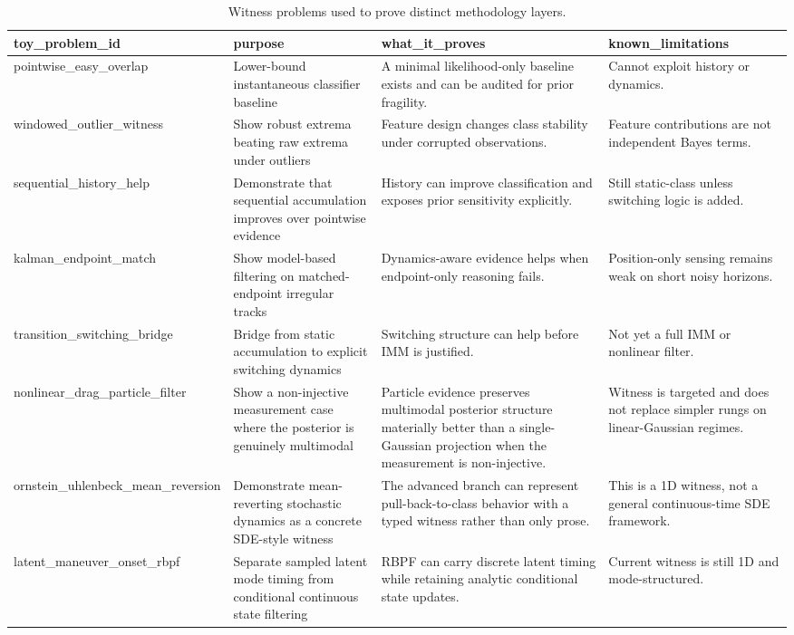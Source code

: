 \begin{table}[htbp]
\centering
\caption{Witness problems used to prove distinct methodology layers.}
\label{tab:witness_problems}
\begin{tabularx}{\textwidth}{lXXX}
\toprule
toy\_problem\_id & purpose & what\_it\_proves & known\_limitations \\
\midrule
pointwise\_easy\_overlap & Lower-bound instantaneous classifier baseline & A minimal likelihood-only baseline exists and can be audited for prior fragility. & Cannot exploit history or dynamics. \\
windowed\_outlier\_witness & Show robust extrema beating raw extrema under outliers & Feature design changes class stability under corrupted observations. & Feature contributions are not independent Bayes terms. \\
sequential\_history\_help & Demonstrate that sequential accumulation improves over pointwise evidence & History can improve classification and exposes prior sensitivity explicitly. & Still static-class unless switching logic is added. \\
kalman\_endpoint\_match & Show model-based filtering on matched-endpoint irregular tracks & Dynamics-aware evidence helps when endpoint-only reasoning fails. & Position-only sensing remains weak on short noisy horizons. \\
transition\_switching\_bridge & Bridge from static accumulation to explicit switching dynamics & Switching structure can help before IMM is justified. & Not yet a full IMM or nonlinear filter. \\
nonlinear\_drag\_particle\_filter & Show a non-injective measurement case where the posterior is genuinely multimodal & Particle evidence preserves multimodal posterior structure materially better than a single-Gaussian projection when the measurement is non-injective. & Witness is targeted and does not replace simpler rungs on linear-Gaussian regimes. \\
ornstein\_uhlenbeck\_mean\_reversion & Demonstrate mean-reverting stochastic dynamics as a concrete SDE-style witness & The advanced branch can represent pull-back-to-class behavior with a typed witness rather than only prose. & This is a 1D witness, not a general continuous-time SDE framework. \\
latent\_maneuver\_onset\_rbpf & Separate sampled latent mode timing from conditional continuous state filtering & RBPF can carry discrete latent timing while retaining analytic conditional state updates. & Current witness is still 1D and mode-structured. \\
\bottomrule
\end{tabularx}
\end{table}